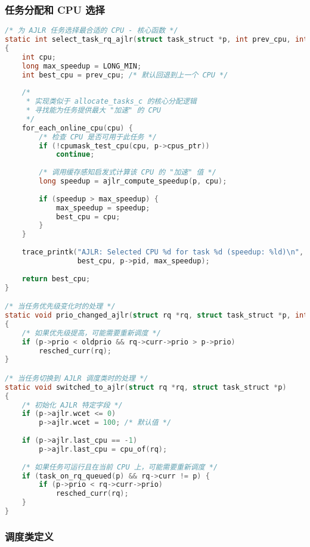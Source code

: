 \documentclass[a4paper,12pt]{article}
\begin{document}
\subsubsection{任务分配和 CPU 选择}

\begin{lstlisting}[language=C]
/* 为 AJLR 任务选择最合适的 CPU - 核心函数 */
static int select_task_rq_ajlr(struct task_struct *p, int prev_cpu, int sd_flag, int wake_flags)
{
    int cpu;
    long max_speedup = LONG_MIN;
    int best_cpu = prev_cpu; /* 默认回退到上一个 CPU */
    
    /* 
     * 实现类似于 allocate_tasks_c 的核心分配逻辑
     * 寻找能为任务提供最大 "加速" 的 CPU
     */
    for_each_online_cpu(cpu) {
        /* 检查 CPU 是否可用于此任务 */
        if (!cpumask_test_cpu(cpu, p->cpus_ptr))
            continue;
        
        /* 调用缓存感知启发式计算该 CPU 的 "加速" 值 */
        long speedup = ajlr_compute_speedup(p, cpu);
        
        if (speedup > max_speedup) {
            max_speedup = speedup;
            best_cpu = cpu;
        }
    }
    
    trace_printk("AJLR: Selected CPU %d for task %d (speedup: %ld)\n", 
                 best_cpu, p->pid, max_speedup);
    
    return best_cpu;
}

/* 当任务优先级变化时的处理 */
static void prio_changed_ajlr(struct rq *rq, struct task_struct *p, int oldprio)
{
    /* 如果优先级提高，可能需要重新调度 */
    if (p->prio < oldprio && rq->curr->prio > p->prio)
        resched_curr(rq);
}

/* 当任务切换到 AJLR 调度类时的处理 */
static void switched_to_ajlr(struct rq *rq, struct task_struct *p)
{
    /* 初始化 AJLR 特定字段 */
    if (p->ajlr.wcet <= 0)
        p->ajlr.wcet = 100; /* 默认值 */
    
    if (p->ajlr.last_cpu == -1)
        p->ajlr.last_cpu = cpu_of(rq);
    
    /* 如果任务可运行且在当前 CPU 上，可能需要重新调度 */
    if (task_on_rq_queued(p) && rq->curr != p) {
        if (p->prio < rq->curr->prio)
            resched_curr(rq);
    }
}
\end{lstlisting}

\subsubsection{调度类定义}
\end{document}
